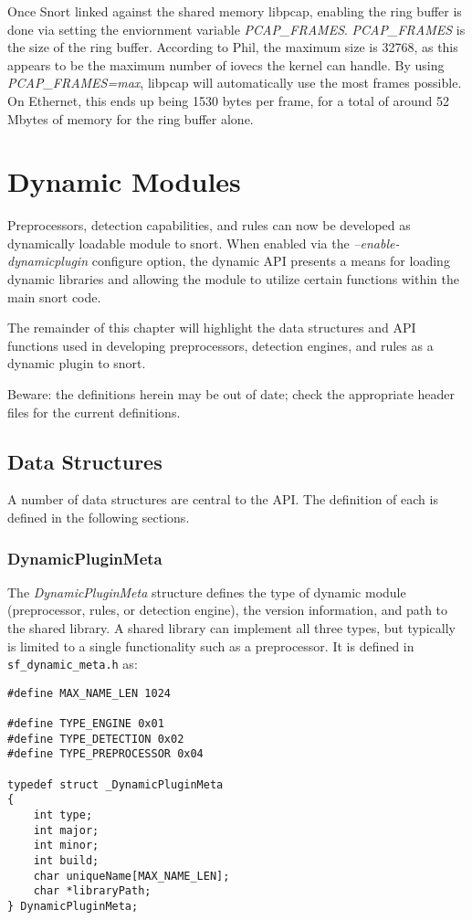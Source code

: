 \documentclass[english]{report}
\begin{document}
Once Snort linked against the shared memory libpcap, enabling the ring buffer
is done via setting the enviornment variable \emph{PCAP\_FRAMES}.
\emph{PCAP\_FRAMES} is the size of the ring buffer.  According to Phil, the
maximum size is 32768, as this appears to be the maximum number of iovecs the
kernel can handle.  By using \emph{PCAP\_FRAMES=max}, libpcap will
automatically use the most frames possible.  On Ethernet, this ends up being
1530 bytes per frame, for a total of around 52 Mbytes of memory for the ring
buffer alone.

\chapter{Dynamic Modules}\label{Dynamic Modules}

Preprocessors, detection capabilities, and rules can now be developed as
dynamically loadable module to snort.  When enabled via the {\em
--enable-dynamicplugin} configure option, the dynamic API presents a means for
loading dynamic libraries and allowing the module to utilize certain functions
within the main snort code.

The remainder of this chapter will highlight the data structures and API
functions used in developing preprocessors, detection engines, and rules as a
dynamic plugin to snort.

Beware:  the definitions herein may be out of date; check the appropriate
header files for the current definitions.

\section{Data Structures}

A number of data structures are central to the API.  The definition of each is
defined in the following sections.

\subsection{DynamicPluginMeta}

The {\em DynamicPluginMeta} structure defines the type of dynamic module
(preprocessor, rules, or detection engine), the version information, and path
to the shared library.  A shared library can implement all three types, but
typically is limited to a single functionality such as a preprocessor.  It is
defined in \texttt{sf\_dynamic\_meta.h} as:

\begin{verbatim}
#define MAX_NAME_LEN 1024

#define TYPE_ENGINE 0x01
#define TYPE_DETECTION 0x02
#define TYPE_PREPROCESSOR 0x04

typedef struct _DynamicPluginMeta
{
    int type;
    int major;
    int minor;
    int build;
    char uniqueName[MAX_NAME_LEN];
    char *libraryPath;
} DynamicPluginMeta;
\end{verbatim}
\end{document}
